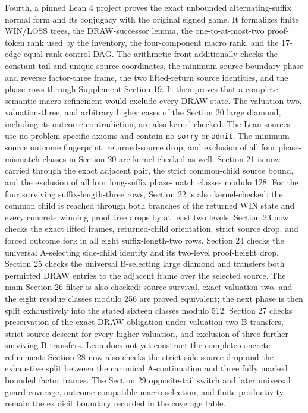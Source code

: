 \documentclass[11pt]{article}
\begin{document}
Fourth, a pinned Lean 4 project proves the exact unbounded alternating-suffix
normal form and its conjugacy with the original signed game.  It formalizes
finite WIN/LOSS trees, the DRAW-successor lemma, the one-to-at-most-two
proof-token rank used by the inventory, the four-component macro rank, and
the 17-edge equal-rank control DAG.  The arithmetic front additionally checks
the constant-tail and unique source coordinates, the minimum-source boundary
phase and reverse factor-three frame, the two lifted-return source identities,
and the phase rows through Supplement Section 19.  It then proves that a
complete semantic macro refinement would exclude every DRAW state.  The
valuation-two, valuation-three, and arbitrary higher cases of the Section 20
large diamond, including its outcome contradiction, are also kernel-checked.
The Lean sources use no problem-specific axioms and contain no \texttt{sorry}
or \texttt{admit}.  The minimum-source outcome fingerprint, returned-source
drop, and exclusion of all four phase-mismatch classes in Section 20 are
kernel-checked as well.  Section 21 is now carried through the exact adjacent
pair, the strict common-child source bound, and the exclusion of all four
long-suffix phase-match classes modulo 128.  For the four surviving
suffix-length-three rows, Section 22 is also kernel-checked: the common child
is reached through both branches of the returned WIN state and every concrete
winning proof tree drops by at least two levels. Section 23 now checks the
exact lifted frames, returned-child orientation, strict source drop, and
forced outcome fork in all eight suffix-length-two rows. Section 24 checks
the universal A-selecting side-child identity and its two-level proof-height
drop. Section 25 checks the universal B-selecting large diamond and transfers
both permitted DRAW entries to the adjacent frame over the selected source.
The main Section 26 filter is also checked: source survival, exact valuation
two, and the eight residue classes modulo 256 are proved equivalent; the
next phase is then split exhaustively into the stated sixteen classes modulo
512. Section 27 checks preservation of the exact DRAW obligation under
valuation-two B transfers, strict source descent for every higher valuation,
and exclusion of three further surviving B transfers. Lean does not yet
construct the complete concrete refinement: Section 28 now also checks the
strict side-source drop and the exhaustive split between the canonical
A-continuation and three fully marked bounded factor frames. The Section 29
opposite-tail switch and later universal guard coverage,
outcome-compatible macro selection, and finite productivity remain the
explicit boundary recorded in the coverage table.
\end{document}

